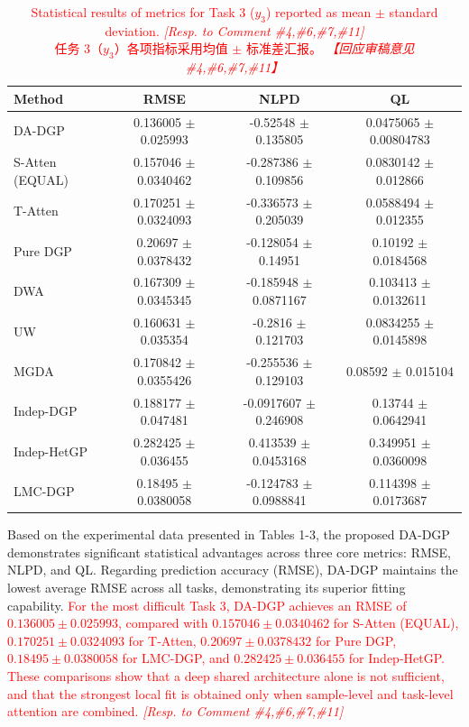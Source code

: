 \documentclass[11pt]{article}
\newcommand{\bicaption}[2]{\caption[#1]{#1\protect\\#2}}
\begin{document}
\begin{table}[htbp]
	\centering
	\bicaption{\textcolor{red}{Statistical results of metrics for Task 3 ($y_3$) reported as mean $\pm$ standard deviation. \textit{[Resp. to Comment \#4,\#6,\#7,\#11]}}}{\textcolor{red}{任务 3（$y_3$）各项指标采用均值 $\pm$ 标准差汇报。 \textit{【回应审稿意见 \#4,\#6,\#7,\#11】}}}
	\label{tab:results_task3}
	{\color{red}\small
	\begin{tabular*}{\textwidth}{@{\extracolsep{\fill}}lccc}
		\toprule
		\textbf{Method} & \textbf{RMSE} & \textbf{NLPD} & \textbf{QL} \\
		\midrule
		DA-DGP & 0.136005 $\pm$ 0.025993 & -0.52548 $\pm$ 0.135805 & 0.0475065 $\pm$ 0.00804783 \\
		S-Atten (EQUAL) & 0.157046 $\pm$ 0.0340462 & -0.287386 $\pm$ 0.109856 & 0.0830142 $\pm$ 0.012866 \\
		T-Atten & 0.170251 $\pm$ 0.0324093 & -0.336573 $\pm$ 0.205039 & 0.0588494 $\pm$ 0.012355 \\
		Pure DGP & 0.20697 $\pm$ 0.0378432 & -0.128054 $\pm$ 0.14951 & 0.10192 $\pm$ 0.0184568 \\
		DWA & 0.167309 $\pm$ 0.0345345 & -0.185948 $\pm$ 0.0871167 & 0.103413 $\pm$ 0.0132611 \\
		UW & 0.160631 $\pm$ 0.035354 & -0.2816 $\pm$ 0.121703 & 0.0834255 $\pm$ 0.0145898 \\
		MGDA & 0.170842 $\pm$ 0.0355426 & -0.255536 $\pm$ 0.129103 & 0.08592 $\pm$ 0.015104 \\
		Indep-DGP & 0.188177 $\pm$ 0.047481 & -0.0917607 $\pm$ 0.246908 & 0.13744 $\pm$ 0.0642941 \\
		Indep-HetGP & 0.282425 $\pm$ 0.036455 & 0.413539 $\pm$ 0.0453168 & 0.349951 $\pm$ 0.0360098 \\
		LMC-DGP & 0.18495 $\pm$ 0.0380058 & -0.124783 $\pm$ 0.0988841 & 0.114398 $\pm$ 0.0173687 \\
		\bottomrule
	\end{tabular*}
	}
\end{table}

Based on the experimental data presented in Tables 1-3, the proposed DA-DGP demonstrates significant statistical advantages across three core metrics: RMSE, NLPD, and QL. Regarding prediction accuracy (RMSE), DA-DGP maintains the lowest average RMSE across all tasks, demonstrating its superior fitting capability. \textcolor{red}{For the most difficult Task 3, DA-DGP achieves an RMSE of $0.136005 \pm 0.025993$, compared with $0.157046 \pm 0.0340462$ for S-Atten (EQUAL), $0.170251 \pm 0.0324093$ for T-Atten, $0.20697 \pm 0.0378432$ for Pure DGP, $0.18495 \pm 0.0380058$ for LMC-DGP, and $0.282425 \pm 0.036455$ for Indep-HetGP. These comparisons show that a deep shared architecture alone is not sufficient, and that the strongest local fit is obtained only when sample-level and task-level attention are combined. \textit{[Resp. to Comment \#4,\#6,\#7,\#11]}}
\end{document}
